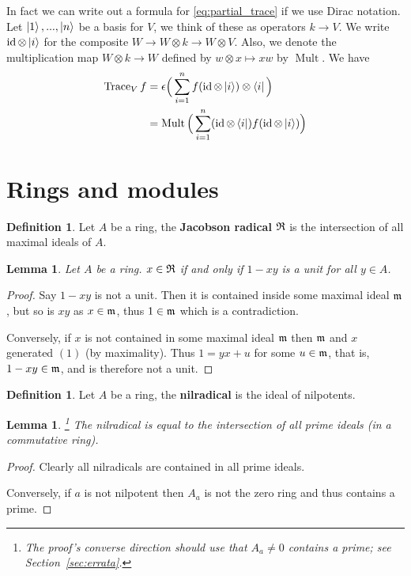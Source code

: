 \documentclass[12pt]{article}
\theoremstyle{plain}
\newtheorem{lemma}[thm]{Lemma}
\theoremstyle{definition}
\newtheorem{defn}[thm]{Definition} %
\newcommand{\lto}{\longrightarrow}
\begin{document}
In fact we can write out a formula for \eqref{eq:partial_trace} if we use Dirac notation. Let $\ket{1},...,\ket{n}$ be a basis for $V$, we think of these as operators $k \lto V$.  We write $\operatorname{id} \otimes \ket{i}$ for the composite $W \lto W \otimes k \lto W \otimes V$.  Also, we denote the multiplication map $W \otimes k \lto W$ defined by $w \otimes x \longmapsto xw$ by $\operatorname{Mult}$. We have
\begin{align*}
\operatorname{Trace}_V f &= \epsilon\Big(\sum_{i = 1}^n f(\operatorname{id} \otimes \ket{i}) \otimes \bra{i}\Big)\\
&= \operatorname{Mult}\Big(\sum_{i = 1}^n (\operatorname{id} \otimes \bra{i})f (\operatorname{id} \otimes \ket{i})\Big)
\end{align*}


\section{Rings and modules}
\begin{defn}
Let $A$ be a ring, the \textbf{Jacobson radical} $\frak{R}$ is the intersection of all maximal ideals of $A$.
\end{defn}
\begin{lemma}
Let $A$ be a ring. $x \in \frak{R}$ if and only if $1 - xy$ is a unit for all $y \in A$.
\end{lemma}
\begin{proof}
Say $1 - xy$ is not a unit. Then it is contained inside some maximal ideal $\frak{m}$, but so is $xy$ as $x \in \frak{m}$, thus $1 \in \frak{m}$ which is a contradiction.

Conversely, if $x$ is not contained in some maximal ideal $\frak{m}$ then $\frak{m}$ and $x$ generated $(1)$ (by maximality). Thus $1 = yx + u$ for some $u \in \frak{m}$, that is, $1 - xy \in \frak{m}$, and is therefore not a unit.
\end{proof}
\begin{defn}
\label{def:nilradical_one}
Let $A$ be a ring, the \textbf{nilradical} is the ideal of nilpotents.
\end{defn}
\begin{lemma}
\label{lem:intersection_primes}\footnote{The proof's converse direction should use that $A_a \ne 0$ contains a prime; see Section~\ref{sec:errata}.}
The nilradical is equal to the intersection of all prime ideals (in a commutative ring).
\end{lemma}
\begin{proof}
Clearly all nilradicals are contained in all prime ideals.

Conversely, if $a$ is not nilpotent then $A_{a}$ is not the zero ring and thus contains a prime.
\end{proof}
\end{document}
